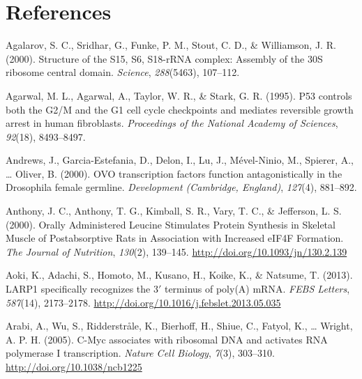 \documentclass[12pt,twoside]{reedthesis}
\newlength{\cslhangindent}
\newenvironment{cslreferences}%
  {\setlength{\parindent}{0pt}%
  \everypar{\setlength{\hangindent}{\cslhangindent}}\ignorespaces}%
  {\par}
\begin{document}
\backmatter

\hypertarget{references}{%
\chapter*{References}\label{references}}


\noindent

\setlength{\parindent}{-0.20in}
\setlength{\leftskip}{0.20in}
\setlength{\parskip}{8pt}

\hypertarget{refs}{}
\begin{cslreferences}
\leavevmode\hypertarget{ref-Agalarov2000}{}%
Agalarov, S. C., Sridhar, G., Funke, P. M., Stout, C. D., \& Williamson, J. R. (2000). Structure of the S15, S6, S18-rRNA complex: Assembly of the 30S ribosome central domain. \emph{Science}, \emph{288}(5463), 107--112.

\leavevmode\hypertarget{ref-Agarwal1995a}{}%
Agarwal, M. L., Agarwal, A., Taylor, W. R., \& Stark, G. R. (1995). P53 controls both the G2/M and the G1 cell cycle checkpoints and mediates reversible growth arrest in human fibroblasts. \emph{Proceedings of the National Academy of Sciences}, \emph{92}(18), 8493--8497.

\leavevmode\hypertarget{ref-Andrews2000a}{}%
Andrews, J., Garcia-Estefania, D., Delon, I., Lu, J., Mével-Ninio, M., Spierer, A., \ldots{} Oliver, B. (2000). OVO transcription factors function antagonistically in the Drosophila female germline. \emph{Development (Cambridge, England)}, \emph{127}(4), 881--892.

\leavevmode\hypertarget{ref-anthonyOrallyAdministeredLeucine2000}{}%
Anthony, J. C., Anthony, T. G., Kimball, S. R., Vary, T. C., \& Jefferson, L. S. (2000). Orally Administered Leucine Stimulates Protein Synthesis in Skeletal Muscle of Postabsorptive Rats in Association with Increased eIF4F Formation. \emph{The Journal of Nutrition}, \emph{130}(2), 139--145. \url{http://doi.org/10.1093/jn/130.2.139}

\leavevmode\hypertarget{ref-aokiLARP1SpecificallyRecognizes2013}{}%
Aoki, K., Adachi, S., Homoto, M., Kusano, H., Koike, K., \& Natsume, T. (2013). LARP1 specifically recognizes the 3\({'}\) terminus of poly(A) mRNA. \emph{FEBS Letters}, \emph{587}(14), 2173--2178. \url{http://doi.org/10.1016/j.febslet.2013.05.035}

\leavevmode\hypertarget{ref-arabiCMycAssociatesRibosomal2005}{}%
Arabi, A., Wu, S., Ridderstråle, K., Bierhoff, H., Shiue, C., Fatyol, K., \ldots{} Wright, A. P. H. (2005). C-Myc associates with ribosomal DNA and activates RNA polymerase I transcription. \emph{Nature Cell Biology}, \emph{7}(3), 303--310. \url{http://doi.org/10.1038/ncb1225}


\end{cslreferences}
\end{document}
